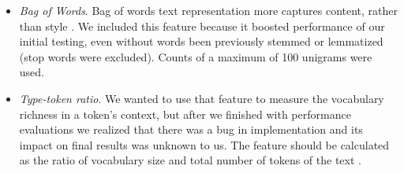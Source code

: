 \documentclass[10pt, a4paper]{article}
\begin{document}
\begin{itemize}
	\item \textit{Bag of Words}. Bag of words text representation more captures content, rather than style \citep{stamatatos-2009a}. We included this feature because it boosted performance of our initial testing, even without words been previously stemmed or lemmatized (stop words were excluded). Counts of a maximum of 100 unigrams were used.
	\item \textit{Type-token ratio}. We wanted to use that feature to measure the vocabulary richness in a token's context, but after we finished with performance evaluations we realized that there was a bug in implementation and its impact on final results was unknown to us. The feature should be calculated as the ratio of vocabulary size and total number of tokens of the text \citep{stamatatos-2009a}.
\end{itemize}
\end{document}
